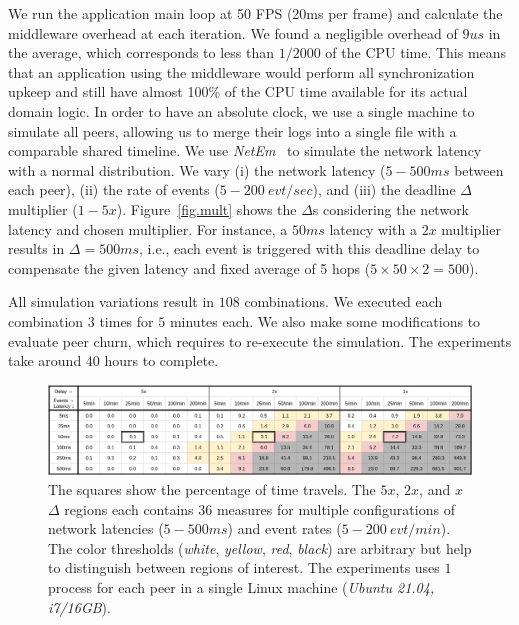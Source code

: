 \documentclass[10pt,journal,compsoc]{IEEEtran}
\newcommand{\code}[1]  {\texttt{\small{#1}}}
\begin{document}
We run the application main loop at 50 FPS (20ms per frame) and calculate
the middleware overhead at each iteration.
We found a negligible overhead of $9us$ in the average, which corresponds to
less than $1/2000$ of the CPU time.
This means that an application using the middleware would perform all
synchronization upkeep and still have almost 100\% of the CPU time available
for its actual domain logic.
%
In order to have an absolute clock, we use a single machine to simulate all
peers, allowing us to merge their logs into a single file with a comparable
shared timeline.
%
We use \emph{NetEm}~\cite{netem} to simulate the network latency with a normal
distribution.
%
We vary
    (i)   the network latency ($5-500ms$ between each peer),
    (ii)  the rate of events ($5-200~evt/sec$), and
    (iii) the deadline $\Delta$ multiplier ($1-5x$).
%
Figure~\ref{fig.mult} shows the $\Delta$s considering the network latency and
chosen multiplier.
For instance, a $50ms$ latency with a $2x$ multiplier results in
$\Delta=500ms$, i.e., each event is triggered with this deadline delay to
compensate the given latency and fixed average of 5 hops
($5 \times 50 \times 2 = 500$).

All simulation variations result in $108$ combinations.
We executed each combination $3$ times for $5$ minutes each.
We also make some modifications to evaluate peer churn, which requires to
re-execute the simulation.
The experiments take around $40$ hours to complete.


\begin{figure}
  \centering
  \includegraphics[width=\linewidth]{baks}
  \caption{
    \label{fig.baks}
The squares show the percentage of time travels.
%
The $5x$, $2x$, and $x$ $\Delta$ regions each contains $36$ measures for
multiple configurations of network latencies ($5-500ms$) and event rates
($5-200~evt/min$).
%
The color thresholds (\emph{white}, \emph{yellow}, \emph{red}, \emph{black})
are arbitrary but help to distinguish between regions of interest.
%
The experiments uses $1$ process for each peer in a single Linux machine
(\emph{Ubuntu 21.04, i7/16GB}).
    }
\end{figure}
\end{document}
